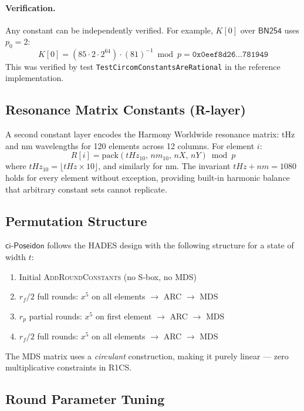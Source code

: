 \documentclass[preprint]{iacrtrans}
\newcommand{\BN}{\ensuremath{\mathsf{BN254}}}
\newcommand{\ciposeidon}{\ensuremath{\mathsf{ci\text{-}Poseidon}}}
\begin{document}
\paragraph{Verification.} Any constant can be independently verified. For
example, $K[0]$ over $\BN$ uses $p_0 = 2$:
\[
  K[0] = (85 \cdot 2 \cdot 2^{64}) \cdot (81)^{-1} \bmod p
       = \mathtt{0x0eef8d26\ldots781949}
\]
This was verified by test \texttt{TestCircomConstantsAreRational} in the
reference implementation.

\subsection{Resonance Matrix Constants (R-layer)}

A second constant layer encodes the Harmony Worldwide resonance matrix:
tHz and nm wavelengths for 120 elements across 12 columns. For element $i$:
\[
  R[i] = \mathrm{pack}(\mathit{tHz}_{10},\, \mathit{nm}_{10},\,
         \mathit{nX},\, \mathit{nY}) \bmod p
\]
where $\mathit{tHz}_{10} = \lfloor\mathit{tHz} \times 10\rfloor$, and
similarly for nm. The invariant $\mathit{tHz} + \mathit{nm} = 1080$ holds for
every element without exception, providing built-in harmonic balance that
arbitrary constant sets cannot replicate.

\subsection{Permutation Structure}

\ciposeidon{} follows the HADES design with the following structure for a
state of width $t$:

\begin{enumerate}
  \item Initial \textsc{AddRoundConstants} (no S-box, no MDS)
  \item $r_f/2$ full rounds: $x^5$ on all elements $\to$ ARC $\to$ MDS
  \item $r_p$ partial rounds: $x^5$ on first element $\to$ ARC $\to$ MDS
  \item $r_f/2$ full rounds: $x^5$ on all elements $\to$ ARC $\to$ MDS
\end{enumerate}

The MDS matrix uses a \emph{circulant} construction, making it purely linear
--- zero multiplicative constraints in R1CS.

\subsection{Round Parameter Tuning}
\label{sec:params}
\end{document}
